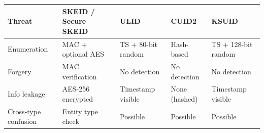 \documentclass[fleqn,10pt,lineno]{wlpeerj}
\begin{document}
{\def\LTcaptype{none} %
\begin{longtable}[]{@{}
  >{\raggedright\arraybackslash}p{}
  >{\raggedright\arraybackslash}p{}
  >{\raggedright\arraybackslash}p{}
  >{\raggedright\arraybackslash}p{}
  >{\raggedright\arraybackslash}p{}@{}}
\toprule\noalign{}
\begin{minipage}[b]{\linewidth}\raggedright
Threat
\end{minipage} & \begin{minipage}[b]{\linewidth}\raggedright
SKEID / Secure SKEID
\end{minipage} & \begin{minipage}[b]{\linewidth}\raggedright
ULID
\end{minipage} & \begin{minipage}[b]{\linewidth}\raggedright
CUID2
\end{minipage} & \begin{minipage}[b]{\linewidth}\raggedright
KSUID
\end{minipage} \\
\midrule\noalign{}
\endhead
\bottomrule\noalign{}
\endlastfoot
Enumeration & MAC + optional AES & TS + 80-bit random & Hash-based & TS
+ 128-bit random \\
Forgery & MAC verification & No detection & No detection & No
detection \\
Info leakage & AES-256 encrypted & Timestamp visible & None (hashed) &
Timestamp visible \\
Cross-type confusion & Entity type check & Possible & Possible &
Possible \\
\end{longtable}
}
\end{document}
